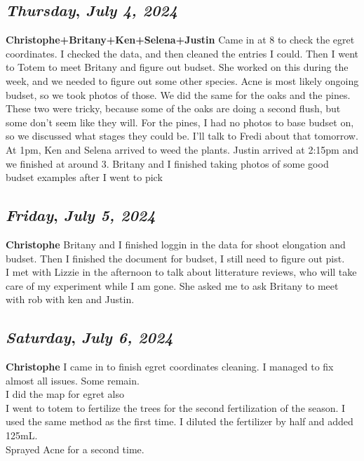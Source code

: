 \def\day{\textit{July 4, 2024}}
\def\weekday{\textit{Thursday}}
\subsection*{\weekday, \day}
\textbf {Christophe+Britany+Ken+Selena+Justin}
Came in at 8 to check the egret coordinates. I checked the data, and then cleaned the entries I could. Then I went to Totem to meet Britany and figure out budset. She worked on this during the week, and we needed to figure out some other species. Acne is most likely ongoing budset, so we took photos of those. We did the same for the oaks and the pines. These two were tricky, because some of the oaks are doing a second flush, but some don't seem like they will. For the pines, I had no photos to base budset on, so we discussed what stages they could be. I'll talk to Fredi about that tomorrow. \\
At 1pm, Ken and Selena arrived to weed the plants. Justin arrived at 2:15pm and we finished at around 3. Britany and I finished taking photos of some good budset examples after I went to pick

\def\day{\textit{July 5, 2024}}
\def\weekday{\textit{Friday}}
\subsection*{\weekday, \day}
\textbf {Christophe}
Britany and I finished loggin in the data for shoot elongation and budset. Then I finished the document for budset, I still need to figure out pist.\\
I met with Lizzie in the afternoon to talk about litterature reviews, who will take care of my experiment while I am gone. She asked me to ask Britany to meet with rob with ken and Justin.

\def\day{\textit{July 6, 2024}}
\def\weekday{\textit{Saturday}}
\subsection*{\weekday, \day}
\textbf {Christophe}
 I came in to finish egret coordinates cleaning. I managed to fix almost all issues. Some remain.\\
 I did the map for egret also\\
 I went to totem to fertilize the trees for the second fertilization of the season. I used the same method as the first time. I diluted the fertilizer by half and added 125mL.\\
 Sprayed Acne for a second time. 

